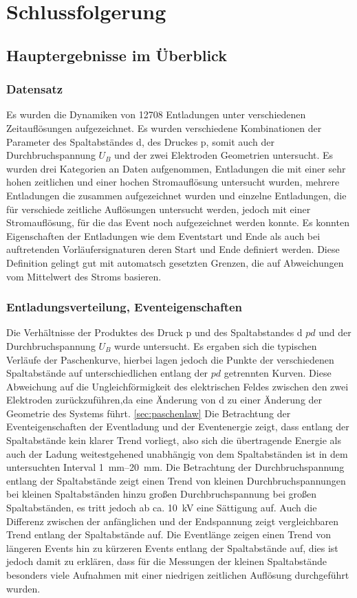 \chapter{Schlussfolgerung}
\label{chap:conclusion}


\section{Hauptergebnisse im Überblick}

\subsection{Datensatz}
Es wurden die Dynamiken von 12708 Entladungen unter verschiedenen Zeitauflösungen aufgezeichnet. Es wurden verschiedene Kombinationen der Parameter des Spaltabständes d, des Druckes p, somit auch der Durchbruchspannung \(U_B\) und der zwei Elektroden Geometrien untersucht. Es wurden drei Kategorien an Daten aufgenommen, Entladungen die mit einer sehr hohen zeitlichen und einer hochen Stromauflösung untersucht wurden, mehrere Entladungen die zusammen aufgezeichnet wurden und einzelne Entladungen, die für verschiede zeitliche Auflösungen untersucht werden, jedoch mit einer Stromauflösung, für die das Event noch aufgezeichnet werden konnte. Es konnten Eigenschaften der Entladungen wie dem Eventstart und Ende als auch bei auftretenden Vorläufersignaturen deren Start und Ende definiert werden. Diese Definition gelingt gut mit automatsch gesetzten Grenzen, die auf Abweichungen vom Mittelwert des Stroms basieren. 

\subsection{Entladungsverteilung, Eventeigenschaften}
Die Verhältnisse der Produktes des Druck p und des Spaltabstandes d \(pd\) und der Durchbruchspannung \(U_B\) wurde untersucht. Es ergaben sich die typischen Verläufe der Paschenkurve, hierbei lagen jedoch die Punkte der verschiedenen Spaltabstände auf unterschiedlichen entlang der \(pd\) getrennten Kurven. Diese Abweichung auf die Ungleichförmigkeit des elektrischen Feldes zwischen den zwei Elektroden zurückzuführen,da eine Änderung von d zu einer Änderung der Geometrie des Systems führt. \ref{sec:paschenlaw} 
Die Betrachtung der Eventeigenschaften der Eventladung und der Eventenergie zeigt, dass entlang der Spaltabstände kein klarer Trend vorliegt, also sich die übertragende Energie als auch der Ladung weitestgehened unabhängig von dem Spaltabständen ist in dem untersuchten Interval \SIrange{1}{20}{\milli\meter}. Die Betrachtung der Durchbruchspannung entlang der Spaltabstände zeigt einen Trend von kleinen Durchbruchspannungen bei kleinen Spaltabständen hinzu großen Durchbruchspannung bei großen Spaltabständen, es tritt jedoch ab ca. \SI{10}{\kilo\volt} eine Sättigung auf. Auch die Differenz zwischen der anfänglichen und der Endspannung zeigt vergleichbaren Trend entlang der Spaltabstände auf. Die Eventlänge zeigen einen Trend von längeren Events hin zu kürzeren Events entlang der Spaltabstände auf, dies ist jedoch damit zu erklären, dass für die Messungen der kleinen Spaltabstände besonders viele Aufnahmen mit einer niedrigen zeitlichen Auflösung durchgeführt wurden. 



